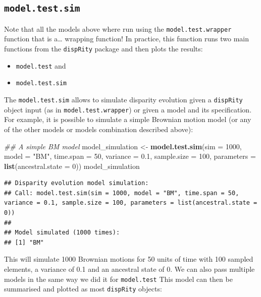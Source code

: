 \documentclass[]{book}
\newenvironment{Shaded}{\begin{snugshade}}{\end{snugshade}}
\newcommand{\CommentTok}[1]{\textcolor[rgb]{0.56,0.35,0.01}{\textit{#1}}}
\newcommand{\DataTypeTok}[1]{\textcolor[rgb]{0.13,0.29,0.53}{#1}}
\newcommand{\DecValTok}[1]{\textcolor[rgb]{0.00,0.00,0.81}{#1}}
\newcommand{\FloatTok}[1]{\textcolor[rgb]{0.00,0.00,0.81}{#1}}
\newcommand{\KeywordTok}[1]{\textcolor[rgb]{0.13,0.29,0.53}{\textbf{#1}}}
\newcommand{\NormalTok}[1]{#1}
\newcommand{\StringTok}[1]{\textcolor[rgb]{0.31,0.60,0.02}{#1}}
\providecommand{\tightlist}{%
  \setlength{\itemsep}{0pt}\setlength{\parskip}{0pt}}
\begin{document}
\hypertarget{model.test.sim}{%
\subsection{\texorpdfstring{\texttt{model.test.sim}}{model.test.sim}}\label{model.test.sim}}

Note that all the models above where run using the \texttt{model.test.wrapper} function that is a\ldots{} wrapping function!
In practice, this function runs two main functions from the \texttt{dispRity} package and then plots the results:

\begin{itemize}
\tightlist
\item
  \texttt{model.test} and
\item
  \texttt{model.test.sim}
\end{itemize}

The \texttt{model.test.sim} allows to simulate disparity evolution given a \texttt{dispRity} object input (as in \texttt{model.test.wrapper}) or given a model and its specification.
For example, it is possible to simulate a simple Brownian motion model (or any of the other models or models combination described above):

\begin{Shaded}
\begin{Highlighting}[]
\CommentTok{## A simple BM model}
\NormalTok{model_simulation <-}\StringTok{ }\KeywordTok{model.test.sim}\NormalTok{(}\DataTypeTok{sim =} \DecValTok{1000}\NormalTok{, }\DataTypeTok{model =} \StringTok{"BM"}\NormalTok{,}
                                   \DataTypeTok{time.span =} \DecValTok{50}\NormalTok{, }\DataTypeTok{variance =} \FloatTok{0.1}\NormalTok{,}
                                   \DataTypeTok{sample.size =} \DecValTok{100}\NormalTok{,}
                                   \DataTypeTok{parameters =} \KeywordTok{list}\NormalTok{(}\DataTypeTok{ancestral.state =} \DecValTok{0}\NormalTok{))}
\NormalTok{model_simulation}
\end{Highlighting}
\end{Shaded}

\begin{verbatim}
## Disparity evolution model simulation:
## Call: model.test.sim(sim = 1000, model = "BM", time.span = 50, variance = 0.1, sample.size = 100, parameters = list(ancestral.state = 0)) 
## 
## Model simulated (1000 times):
## [1] "BM"
\end{verbatim}

This will simulate 1000 Brownian motions for 50 units of time with 100 sampled elements, a variance of 0.1 and an ancestral state of 0.
We can also pass multiple models in the same way we did it for \texttt{model.test}
This model can then be summarised and plotted as most \texttt{dispRity} objects:
\end{document}
